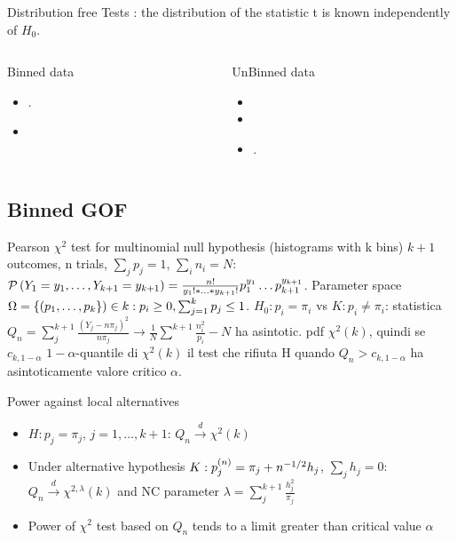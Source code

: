 \begin{frame}{Distribution free Tests}
: the distribution of the statistic t is known independently of $H_0$.
\begin{columns}[T]
\begin{column}{0.5\textwidth}
\begin{block}{Binned data}
\begin{itemize}
\item {}.
\item {}
\end{itemize}
\end{block}
\end{column}
\begin{column}{0.5\textwidth}
\begin{block}{UnBinned data}
\begin{itemize}
\item {}
\item {}
\item {}.
\end{itemize}
\end{block}
\end{column}
\end{columns}
\end{frame}

\subsection{Binned GOF}\label{binnedgof}

\begin{frame}{Pearson $\chi^2$ test for multinomial null hypothesis (histograms with k bins)}
$k+1$ outcomes, n trials, $\sum_jp_j=1$, $\sum_in_i=N$: $\operatorname{\mathcal{P}}{(Y_1=y_1,\ldots,Y_{k+1}=y_{k+1})}=\frac{n!}{y_1!*\ldots*y_{k+1}!}p_1^{y_1}\ldots p_{k+1}^{y_{k+1}}$. Parameter space $\Omega=\{(p_1,\ldots,p_k\})\in \real{k}: p_i\geq0,\sum_{j=1}^kp_j\leq1$.
$H_0: p_i=\pi_i$ vs $K: p_i\neq\pi_i$:
statistica $Q_n=\sum_j^{k+1}\frac{(Y_j-n\pi_j)^2}{n\pi_j}\to\frac{1}{N}\sum^{k+1}\frac{n_i^2}{p_i}-N$ ha asintotic. pdf $\chi^2(k)$, quindi se $c_{k,1-\alpha}$ $1-\alpha$-quantile di $\chi^2(k)$ il test che rifiuta H quando $Q_n>c_{k,1-\alpha}$ ha asintoticamente valore critico $\alpha$.
\begin{block}{Power against local alternatives}
	\begin{itemize}
		\item $H: p_j=\pi_j$, $j=1,\ldots,k+1$: $Q_n\xrightarrow{d}\chi^2(k)$
		\item Under alternative hypothesis $K: p_j^{(n)}=\pi_j+n^{-1/2}h_j$, $\sum_jh_j=0$: $Q_n\xrightarrow{d}\chi^{2,\lambda}(k)$ and NC parameter $\lambda=\sum_j^{k+1}\frac{h_j^2}{\pi_j}$
		\item Power of $\chi^2$ test based on $Q_n$ tends to a limit greater than critical value $\alpha$
	\end{itemize}
\end{block}
\end{frame}

